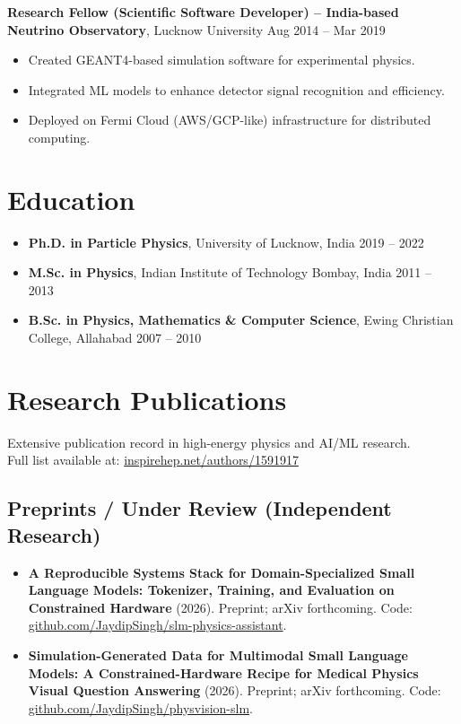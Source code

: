 \documentclass[a4paper,10pt]{article}
\begin{document}
\textbf{Research Fellow (Scientific Software Developer) – India-based Neutrino Observatory}, Lucknow University \hfill Aug 2014 – Mar 2019
\begin{itemize}[leftmargin=0.5cm]
  \item Created GEANT4-based simulation software for experimental physics.
  \item Integrated ML models to enhance detector signal recognition and efficiency.
  \item Deployed on Fermi Cloud (AWS/GCP-like) infrastructure for distributed computing.
\end{itemize}

\section{Education}
\begin{itemize}[leftmargin=0.5cm]
  \item \textbf{Ph.D. in Particle Physics}, University of Lucknow, India \hfill 2019 – 2022
  \item \textbf{M.Sc. in Physics}, Indian Institute of Technology Bombay, India \hfill 2011 – 2013
  \item \textbf{B.Sc. in Physics, Mathematics \& Computer Science}, Ewing Christian College, Allahabad \hfill 2007 – 2010
\end{itemize}


\section{Research Publications}
Extensive publication record in high-energy physics and AI/ML research. \\
Full list available at: \href{https://inspirehep.net/authors/1591917}{inspirehep.net/authors/1591917}

\subsection*{Preprints / Under Review (Independent Research)}
\begin{itemize}[leftmargin=0.5cm]
  \item \textbf{A Reproducible Systems Stack for Domain-Specialized Small Language Models: Tokenizer, Training, and Evaluation on Constrained Hardware} (2026). Preprint; arXiv forthcoming. Code: \href{https://github.com/JaydipSingh/slm-physics-assistant}{github.com/JaydipSingh/slm-physics-assistant}.
  \item \textbf{Simulation-Generated Data for Multimodal Small Language Models: A Constrained-Hardware Recipe for Medical Physics Visual Question Answering} (2026). Preprint; arXiv forthcoming. Code: \href{https://github.com/JaydipSingh/physvision-slm}{github.com/JaydipSingh/physvision-slm}.
\end{itemize}
\end{document}
